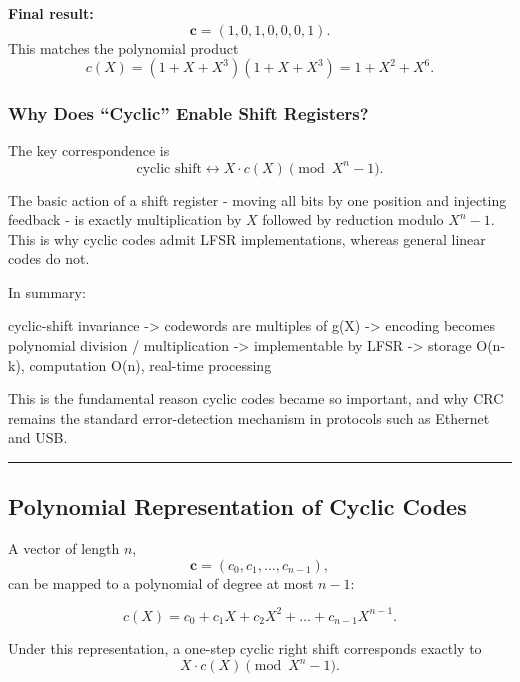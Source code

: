 \documentclass[
]{article}
\newenvironment{Shaded}{}{}
\newcommand{\NormalTok}[1]{#1}
\begin{document}
\textbf{Final result:} \[\mathbf{c}=(1,0,1,0,0,0,1).\] This matches the
polynomial product \[c(X)=(1+X+X^3)(1+X+X^3)=1+X^2+X^6.\]

\subsubsection{Why Does ``Cyclic'' Enable Shift
Registers?}\label{why-does-cyclic-enable-shift-registers}

The key correspondence is
\[\text{cyclic shift} \longleftrightarrow X \cdot c(X) \pmod{X^n-1}.\]

The basic action of a shift register - moving all bits by one position
and injecting feedback - is exactly multiplication by \(X\) followed by
reduction modulo \(X^n-1\). This is why cyclic codes admit LFSR
implementations, whereas general linear codes do not.

In summary:

\begin{Shaded}
\begin{Highlighting}[]
\NormalTok{cyclic{-}shift invariance}
\NormalTok{    {-}\textgreater{} codewords are multiples of g(X)}
\NormalTok{    {-}\textgreater{} encoding becomes polynomial division / multiplication}
\NormalTok{    {-}\textgreater{} implementable by LFSR}
\NormalTok{    {-}\textgreater{} storage O(n{-}k), computation O(n), real{-}time processing}
\end{Highlighting}
\end{Shaded}

This is the fundamental reason cyclic codes became so important, and why
CRC remains the standard error-detection mechanism in protocols such as
Ethernet and USB.

\begin{center}\rule{0.5\linewidth}{0.5pt}\end{center}

\subsection{Polynomial Representation of Cyclic Codes}\label{how-do-we-represent-cyclic-codes-using-polynomials}

A vector of length \(n\), \[\mathbf{c}=(c_0,c_1,\dots,c_{n-1}),\] can be
mapped to a polynomial of degree at most \(n-1\):

\[c(X)=c_0 + c_1 X + c_2 X^2 + \dots + c_{n-1}X^{n-1}.\]

Under this representation, a one-step cyclic right shift corresponds
exactly to \[X \cdot c(X) \pmod{X^n-1}.\]
\end{document}
